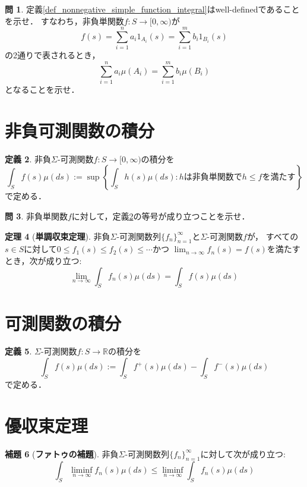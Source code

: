 \documentclass{jsreport}
\theoremstyle{definition}
\newtheorem{defi}{定義}[section]
\newtheorem{lem}[defi]{補題}
\newtheorem{thm}[defi]{定理}
\newtheorem{qst}[defi]{問}
\begin{document}
\begin{qst}\label{qst_simple_function_integral}
定義\ref{def_nonnegative_simple_function_integral}はwell-definedであることを示せ．
すなわち，非負単関数$f \colon S\to[0,\infty)$が
\[ f(s)=\sum_{i=1}^n a_i1_{A_i}(s)=\sum_{i=1}^m b_i1_{B_i}(s) \]
の2通りで表されるとき，
\[ \sum_{i=1}^n a_i\mu(A_i)=\sum_{i=1}^m b_i\mu(B_i) \]
となることを示せ．
\end{qst}

\section{非負可測関数の積分}

\begin{defi}\label{def_nonnegative_function_integral}
非負$\Sigma$-可測関数$f \colon S\to\mathbb[0,\infty)$の積分を
\[ \int_S f(s)\mu(ds):=\sup\left\{\int_Sh(s)\mu(ds):hは非負単関数でh \leq fを満たす\right\} \]
で定める．
\end{defi}

\begin{qst}\label{qst_nonnegative_function_integral_and_simple_function}
非負単関数$f$に対して，定義\ref{def_nonnegative_function_integral}の等号が成り立つことを示せ．
\end{qst}

\begin{thm}[\textbf{単調収束定理}]\label{monotone_convergence_theorem}
非負$\Sigma$-可測関数列$\{f_n\}_{n=1}^\infty$と$\Sigma$-可測関数$f$が，
すべての$s \in S$に対して$0 \leq f_1(s) \leq f_2(s) \leq\cdots$かつ
$\displaystyle\lim_{n\to\infty}f_n(s)=f(s)$を満たすとき，次が成り立つ:
\[ \lim_{n\to\infty}\int_S f_n(s)\mu(ds)=\int_S f(s)\mu(ds) \]
\end{thm}

\section{可測関数の積分}

\begin{defi}\label{def_measurable_function_integral}
$\Sigma$-可測関数$f \colon S\to\mathbb{R}$の積分を
\[ \int_S f(s)\mu(ds):=\int_S f^+(s)\mu(ds)-\int_S f^-(s)\mu(ds)  \]
で定める．
\end{defi}

\section{優収束定理}

\begin{lem}[\textbf{ファトゥの補題}]\label{Fatou_lemma}
非負$\Sigma$-可測関数列$\{f_n\}_{n=1}^\infty$に対して次が成り立つ:
\[ \int_S\liminf_{n\to\infty}f_n(s)\mu(ds)\leq\liminf_{n\to\infty}\int_S f_n(s)\mu(ds) \]
\end{lem}
\end{document}
